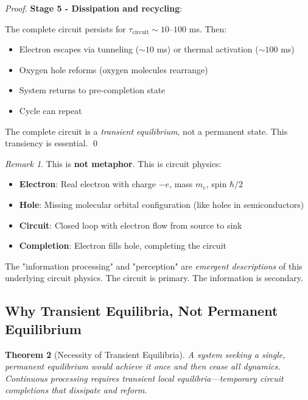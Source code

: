 \documentclass[11pt]{article}
\newtheorem{theorem}{Theorem}[section]
\theoremstyle{remark}
\newtheorem{remark}[theorem]{Remark}
\begin{document}
\begin{proof}
\textbf{Stage 5 - Dissipation and recycling}:

The complete circuit persists for $\tau_{\text{circuit}} \sim 10$--$100$ ms. Then:
\begin{itemize}
\item Electron escapes via tunneling ($\sim 10$ ms) or thermal activation ($\sim 100$ ms)
\item Oxygen hole reforms (oxygen molecules rearrange)
\item System returns to pre-completion state
\item Cycle can repeat
\end{itemize}

The complete circuit is a \textit{transient equilibrium}, not a permanent state. This transiency is essential. \qed
\end{proof}

\begin{remark}
This is \textbf{not metaphor}. This is circuit physics:

\begin{itemize}
\item \textbf{Electron}: Real electron with charge $-e$, mass $m_e$, spin $\hbar/2$
\item \textbf{Hole}: Missing molecular orbital configuration (like holes in semiconductors)
\item \textbf{Circuit}: Closed loop with electron flow from source to sink
\item \textbf{Completion}: Electron fills hole, completing the circuit
\end{itemize}

The "information processing" and "perception" are \textit{emergent descriptions} of this underlying circuit physics. The circuit is primary. The information is secondary.
\end{remark}

\subsection{Why Transient Equilibria, Not Permanent Equilibrium}

\begin{theorem}[Necessity of Transient Equilibria]
\label{thm:transient_necessity}
A system seeking a single, permanent equilibrium would achieve it once and then cease all dynamics. Continuous processing requires \textit{transient local equilibria}—temporary circuit completions that dissipate and reform.
\end{theorem}
\end{document}
